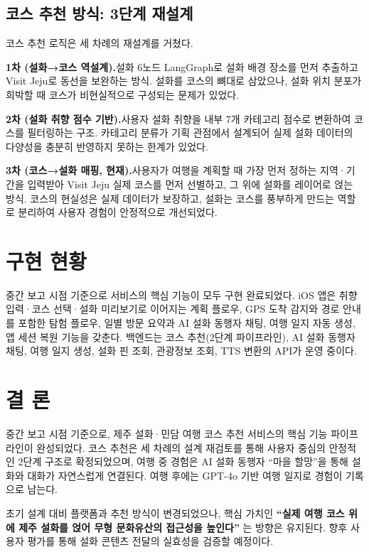 \documentclass[10pt,twocolumn,a4paper]{article}
\begin{document}
\subsection{코스 추천 방식: 3단계 재설계}

코스 추천 로직은 세 차례의 재설계를 거쳤다.

\textbf{1차 (설화→코스 역설계).}\quad 설화 6노드 LangGraph로 설화 배경 장소를
먼저 추출하고 Visit Jeju로 동선을 보완하는 방식. 설화를 코스의 뼈대로
삼았으나, 설화 위치 분포가 희박할 때 코스가 비현실적으로 구성되는 문제가
있었다.

\textbf{2차 (설화 취향 점수 기반).}\quad 사용자 설화 취향을 내부 7개 카테고리
점수로 변환하여 코스를 필터링하는 구조. 카테고리 분류가 기획 관점에서 설계되어
실제 설화 데이터의 다양성을 충분히 반영하지 못하는 한계가 있었다.

\textbf{3차 (코스→설화 매핑, 현재).}\quad 사용자가 여행을 계획할 때 가장 먼저
정하는 지역·기간을 입력받아 Visit Jeju 실제 코스를 먼저 선별하고, 그 위에
설화를 레이어로 얹는 방식. 코스의 현실성은 실제 데이터가 보장하고, 설화는
코스를 풍부하게 만드는 역할로 분리하여 사용자 경험이 안정적으로 개선되었다.

\section{구현 현황}

중간 보고 시점 기준으로 서비스의 핵심 기능이 모두 구현 완료되었다.
iOS 앱은 취향 입력·코스 선택·설화 미리보기로 이어지는 계획 플로우,
GPS 도착 감지와 경로 안내를 포함한 탐험 플로우, 일별 방문 요약과
AI 설화 동행자 채팅, 여행 일지 자동 생성, 앱 세션 복원 기능을 갖춘다.
백엔드는 코스 추천(2단계 파이프라인), AI 설화 동행자 채팅, 여행 일지
생성, 설화 핀 조회, 관광정보 조회, TTS 변환의 API가 운영 중이다.

\section{결 론}

중간 보고 시점 기준으로, 제주 설화·민담 여행 코스 추천 서비스의 핵심 기능
파이프라인이 완성되었다. 코스 추천은 세 차례의 설계 재검토를 통해
사용자 중심의 안정적인 2단계 구조로 확정되었으며, 여행 중 경험은 AI 설화
동행자 ``마을 할망''을 통해 설화와 대화가 자연스럽게 연결된다. 여행 후에는
GPT-4o 기반 여행 일지로 경험이 기록으로 남는다.

초기 설계 대비 플랫폼과 추천 방식이 변경되었으나, 핵심 가치인
\textbf{``실제 여행 코스 위에 제주 설화를 얹어 무형 문화유산의 접근성을
높인다''} 는 방향은 유지된다. 향후 사용자 평가를 통해 설화 콘텐츠 전달의
실효성을 검증할 예정이다.
\end{document}

